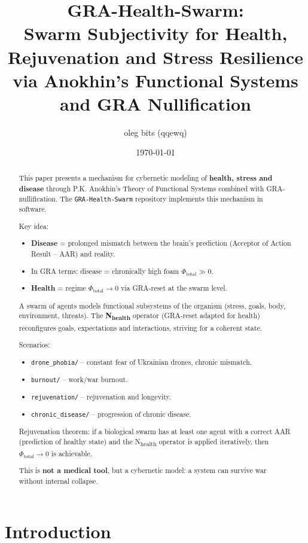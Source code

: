 \documentclass[11pt,a4paper]{article}
\title{
  GRA-Health-Swarm: \\
  Swarm Subjectivity for Health, Rejuvenation and Stress Resilience \\
  via Anokhin's Functional Systems and GRA Nullification
}
\author{oleg bits (qqewq)}
\date{\today}
\begin{document}
\maketitle

\begin{abstract}
This paper presents a mechanism for cybernetic modeling of \textbf{health, stress and disease} through P.K. Anokhin's Theory of Functional Systems combined with GRA-nullification.
The \texttt{GRA-Health-Swarm} repository implements this mechanism in software.

Key idea:
\begin{itemize}
  \item \textbf{Disease} = prolonged mismatch between the brain's prediction (Acceptor of Action Result -- AAR) and reality.
  \item In GRA terms: disease = chronically high foam $\Phi_{\text{total}} \gg 0$.
  \item \textbf{Health} = regime $\Phi_{\text{total}} \to 0$ via GRA-reset at the swarm level.
\end{itemize}

A swarm of agents models functional subsystems of the organism (stress, goals, body, environment, threats).
The \textbf{N\textsubscript{health}} operator (GRA-reset adapted for health) reconfigures goals, expectations and interactions, striving for a coherent state.

Scenarios:
\begin{itemize}
  \item \texttt{drone\_phobia/} -- constant fear of Ukrainian drones, chronic mismatch.
  \item \texttt{burnout/} -- work/war burnout.
  \item \texttt{rejuvenation/} -- rejuvenation and longevity.
  \item \texttt{chronic\_disease/} -- progression of chronic disease.
\end{itemize}

Rejuvenation theorem: if a biological swarm has at least one agent with a correct AAR (prediction of healthy state) and the N\textsubscript{health} operator is applied iteratively, then $\Phi_{\text{total}} \to 0$ is achievable.

This is \textbf{not a medical tool}, but a cybernetic model: a system can survive war without internal collapse.
\end{abstract}

\section{Introduction}
\end{document}
